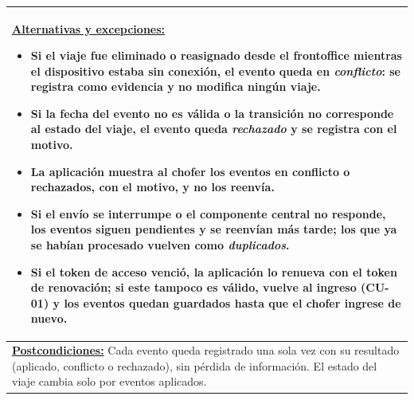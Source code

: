 \begin{table}[H]
\begin{tabular}{|p{15.8cm}|}
\textbf{\underline{Alternativas y excepciones:}}\par
\begin{itemize}[leftmargin=*,topsep=2pt,itemsep=1pt,parsep=0pt,partopsep=0pt]
    \item Si el viaje fue eliminado o reasignado desde el frontoffice mientras el dispositivo estaba sin conexión, el evento queda en \emph{conflicto}: se registra como evidencia y no modifica ningún viaje.
    \item Si la fecha del evento no es válida o la transición no corresponde al estado del viaje, el evento queda \emph{rechazado} y se registra con el motivo.
    \item La aplicación muestra al chofer los eventos en conflicto o rechazados, con el motivo, y no los reenvía.
    \item Si el envío se interrumpe o el componente central no responde, los eventos siguen pendientes y se reenvían más tarde; los que ya se habían procesado vuelven como \emph{duplicados}.
    \item Si el token de acceso venció, la aplicación lo renueva con el token de renovación; si este tampoco es válido, vuelve al ingreso (CU-01) y los eventos quedan guardados hasta que el chofer ingrese de nuevo.
\end{itemize} \\ \hline
\textbf{\underline{Postcondiciones:}} Cada evento queda registrado una sola vez con su resultado (aplicado, conflicto o rechazado), sin pérdida de información. El estado del viaje cambia solo por eventos aplicados. \\ \hline
\end{tabular}
\end{table}

